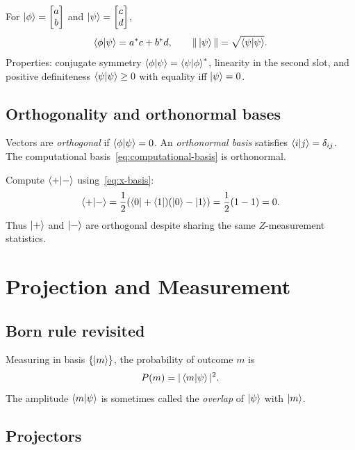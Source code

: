 For $\ket{\phi}=\begin{bmatrix}a\\b\end{bmatrix}$ and $\ket{\psi}=\begin{bmatrix}c\\d\end{bmatrix}$,
\begin{equation}
\braket{\phi|\psi}=a^*c+b^*d,\qquad
\|\ket{\psi}\|=\sqrt{\braket{\psi|\psi}}.
\label{eq:inner-product}
\end{equation}
Properties: conjugate symmetry $\braket{\phi|\psi}=\braket{\psi|\phi}^*$, linearity in the second slot, and positive definiteness $\braket{\psi|\psi}\ge 0$ with equality iff $\ket{\psi}=0$.

\subsection{Orthogonality and orthonormal bases}

Vectors are \emph{orthogonal} if $\braket{\phi|\psi}=0$. An \emph{orthonormal basis} satisfies $\braket{i|j}=\delta_{ij}$. The computational basis~\eqref{eq:computational-basis} is orthonormal.

\begin{example}
Compute $\braket{+|-}$ using~\eqref{eq:x-basis}:
\[
\braket{+|-}=\frac{1}{2}(\bra{0}+\bra{1})(\ket{0}-\ket{1})=\frac{1}{2}(1-1)=0.
\]
Thus $\ket{+}$ and $\ket{-}$ are orthogonal despite sharing the same $Z$-measurement statistics.
\end{example}

\section{Projection and Measurement}
\label{sec:projection}

\subsection{Born rule revisited}

Measuring in basis $\{\ket{m}\}$, the probability of outcome $m$ is
\begin{equation}
P(m)=|\braket{m|\psi}|^2.
\label{eq:born-rule}
\end{equation}
The amplitude $\braket{m|\psi}$ is sometimes called the \emph{overlap} of $\ket{\psi}$ with $\ket{m}$.

\subsection{Projectors}

